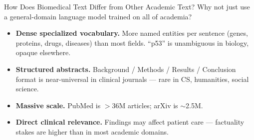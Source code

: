 \documentclass[aspectratio=169,11pt]{beamer}
\begin{document}
\begin{frame}{How Does Biomedical Text Differ from Other Academic Text?}
Why not just use a general-domain language model trained on all of academia?

\vspace{0.2em}
\begin{itemize}[<+->]\setlength\itemsep{0.05em}
  \item \textbf{Dense specialized vocabulary.} More named entities per sentence (genes, proteins, drugs, diseases) than most fields. ``p53'' is unambiguous in biology, opaque elsewhere.
  \item \textbf{Structured abstracts.} Background / Methods / Results / Conclusion format is near-universal in clinical journals --- rare in CS, humanities, social science.
  \item \textbf{Massive scale.} PubMed is $>$36M articles; arXiv is $\sim$2.5M.
  \item \textbf{Direct clinical relevance.} Findings may affect patient care --- factuality stakes are higher than in most academic domains.
\end{itemize}

\end{frame}
\end{document}
